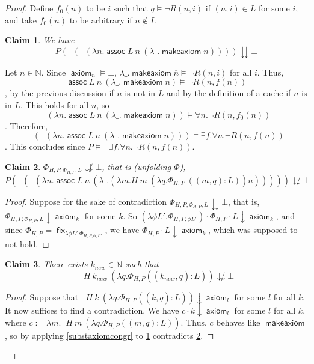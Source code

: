 \documentclass{article}
\newtheorem{claim}{Claim}
\DeclareMathOperator{\makeaxiom}{\mathsf{makeaxiom}}
\DeclareMathOperator{\axiom}{\mathsf{axiom}}
\DeclareMathOperator{\assoc}{\mathsf{assoc}}
\DeclareMathOperator{\fix}{\mathsf{fix}}
\DeclareMathOperator{\introexists}{\mathsf{intro}_\exists}
\DeclareMathOperator{\introforall}{\mathsf{intro}_\forall}
\DeclareMathOperator{\elimforall}{\mathsf{elim}_\forall}
\newcommand{\N}{\mathbb{N}}
\begin{document}
\begin{proof}
    Define $f_0(n)$ to be $i$ such that $q \models \neg R(n, i)$ if $(n, i) \in L$ for some $i$, and take $f_0(n)$ to be arbitrary if $n \notin I$.

    \begin{claim}\label{axiomred}
        We have
        \[ P (\introexists (\introforall (\lambda n. \assoc L\ n\ (\lambda \_. \makeaxiom n)))) \downdownarrows \bot\]
    \end{claim}
    Let $n \in \N$.
    Since $\axiom_n \models \bot$, $\lambda \_. \makeaxiom \overline{n} \models \neg R(n, i)$ for all $i$.
    Thus, \[ \assoc L\ \overline{n}\ (\lambda \_. \makeaxiom \overline{n}) \models \neg R(n, f(n)) \], by the previous discussion if $n$ is not in $L$ and by the definition of a cache if $n$ is in $L$.
    This holds for all $n$, so \[ \introforall (\lambda n. \assoc L\ n\ (\lambda \_. \makeaxiom n)) \models \forall n. \neg R(n, f_0(n)) \].
    Therefore, \[ \introexists (\introforall (\lambda n. \assoc L\ n\ (\lambda \_. \makeaxiom n))) \models \exists f. \forall n. \neg R(n, f(n)) \].
    This concludes since $P \models \neg \exists f. \forall n. \neg R(n, f(n))$.

    \begin{claim}\label{notred}
        $\Phi_{H, P, \Phi_{H, P}, L} \not\downdownarrows \bot$, that is (unfolding $\Phi$),
    \[ P (\introexists (\introforall (\lambda n. \assoc L\ n\ (\lambda \_. (\lambda m. H\ m\ (\lambda q. \Phi_{H, P}\ ((m, q):L)) n))))) \not\downdownarrows \bot\]
    \end{claim}
    \begin{proof}
        Suppose for the sake of contradiction $\Phi_{H, P, \Phi_{H, P}, L} \downdownarrows \bot$, that is, $\Phi_{H, P, \Phi_{H, P}, L} \downarrow \axiom_k$ for some $k$.
        So $(\lambda \phi L'. \Phi_{H, P, \phi L'}) \cdot \Phi_{H, P} \cdot L \downarrow \axiom_k$, and since $\Phi_{H, P} = \fix_{\lambda \phi L'. \Phi_{H, P, \phi, L'}}$, we have $\Phi_{H, P} \cdot L \downarrow \axiom_k$, which was supposed to not hold.
    \end{proof}

    \begin{claim}\label{new}
        There exists $k_{new} \in \N$ such that
        \[ \elimforall H\ \overline{k_{new}}\ (\lambda q. \Phi_{H, P} ((\overline{k_{new}}, q):L)) \not\downdownarrows \bot \]
    \end{claim}
    \begin{proof}
        Suppose that $ \elimforall H\ \overline{k}\ (\lambda q. \Phi_{H, P} ((\overline{k}, q):L)) \downarrow \axiom_l$ for some $l$ for all $k$.
        It now suffices to find a contradiction.
        We have $c \cdot \overline{k} \downarrow \axiom_l$ for some $l$ for all $k$, where $c := \lambda m. \elimforall H\ m\ (\lambda q. \Phi_{H, P} ((m, q):L))$.
        Thus, $c$ behaves like $\makeaxiom$, so by applying \cref{substaxiomcongr} to \cref{axiomred} contradicts \cref{notred}.
    \end{proof}


\end{proof}
\end{document}
